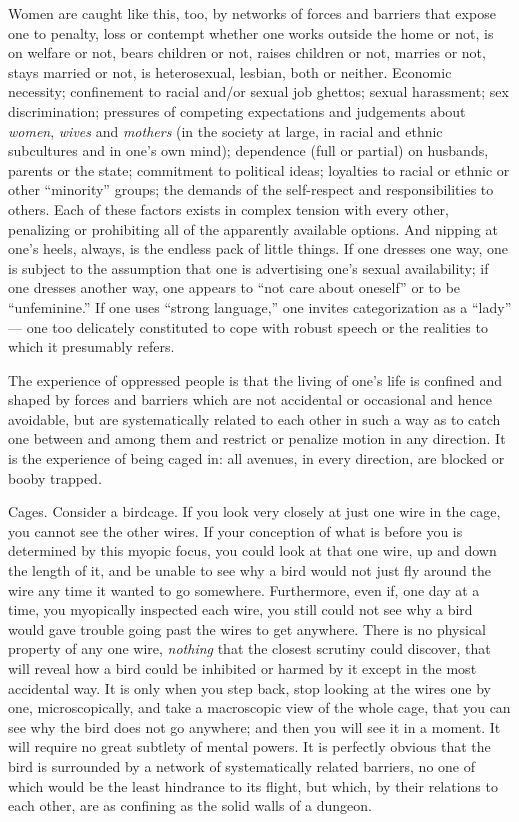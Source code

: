 \documentclass{article}
\begin{document}
Women are caught like this, too, by networks of forces and barriers that expose
one to penalty, loss or contempt whether one works outside the home or not, is
on welfare or not, bears children or not, raises children or not, marries or
not, stays married or not, is heterosexual, lesbian, both or neither. Economic
necessity; confinement to racial and/or sexual job ghettos; sexual harassment;
sex discrimination; pressures of competing expectations and judgements about
\emph{women}, \emph{wives} and \emph{mothers} (in the society at large, in
racial and ethnic subcultures and in one's own mind); dependence (full or
partial) on husbands, parents or the state; commitment to political ideas;
loyalties to racial or ethnic or other ``minority'' groups; the demands of the
self-respect and responsibilities to others. Each of these factors exists in
complex tension with every other, penalizing or prohibiting all of the
apparently available options. And nipping at one's heels, always, is the
endless pack of little things. If one dresses one way, one is subject to the
assumption that one is advertising one's sexual availability; if one dresses
another way, one appears to ``not care about oneself'' or to be ``unfeminine.''
If one uses ``strong language,'' one invites categorization as a ``lady'' ---
one too delicately constituted to cope with robust speech or the realities to
which it presumably refers.

The experience of oppressed people is that the living of one's life is confined
and shaped by forces and barriers which are not accidental or occasional and
hence avoidable, but are systematically related to each other in such a way as
to catch one between and among them and restrict or penalize motion in any
direction. It is the experience of being caged in: all avenues, in every
direction, are blocked or booby trapped.

Cages. Consider a birdcage. If you look very closely at just one wire in the
cage, you cannot see the other wires. If your conception of what is before you
is determined by this myopic focus, you could look at that one wire, up and
down the length of it, and be unable to see why a bird would not just fly
around the wire any time it wanted to go somewhere.  Furthermore, even if, one
day at a time, you myopically inspected each wire, you still could not see why
a bird would gave trouble going past the wires to get anywhere. There is no
physical property of any one wire, \emph{nothing} that the closest scrutiny
could discover, that will reveal how a bird could be inhibited or harmed by it
except in the most accidental way. It is only when you step back, stop looking
at the wires one by one, microscopically, and take a macroscopic view of the
whole cage, that you can see why the bird does not go anywhere; and then you
will see it in a moment. It will require no great subtlety of mental powers. It
is perfectly obvious that the bird is surrounded by a network of systematically
related barriers, no one of which would be the least hindrance to its flight,
but which, by their relations to each other, are as confining as the solid
walls of a dungeon.
\end{document}
